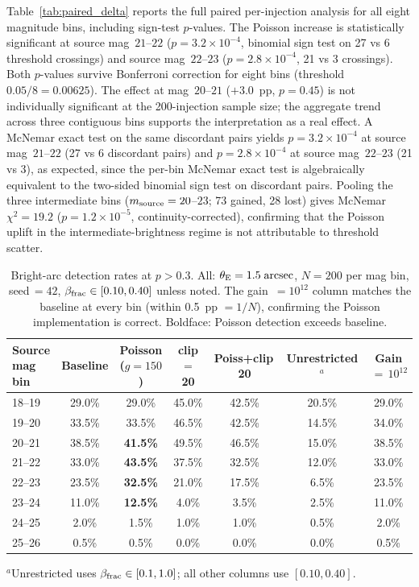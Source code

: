\documentclass[fleqn,usenatbib]{rasti}
\begin{document}
Table~\ref{tab:paired_delta} reports the full paired per-injection analysis for all eight magnitude bins, including sign-test $p$-values.  The Poisson increase is statistically significant at source mag~$21$--$22$ ($p = 3.2 \times 10^{-4}$, binomial sign test on 27 vs 6 threshold crossings) and source mag~$22$--$23$ ($p = 2.8 \times 10^{-4}$, 21 vs 3 crossings).  Both $p$-values survive Bonferroni correction for eight bins (threshold $0.05/8 = 0.00625$).  The effect at mag~$20$--$21$ ($+3.0$~pp, $p = 0.45$) is not individually significant at the 200-injection sample size; the aggregate trend across three contiguous bins supports the interpretation as a real effect.  A McNemar exact test on the same discordant pairs yields $p = 3.2 \times 10^{-4}$ at source mag~$21$--$22$ (27 vs 6 discordant pairs) and $p = 2.8 \times 10^{-4}$ at source mag~$22$--$23$ (21 vs 3), as expected, since the per-bin McNemar exact test is algebraically equivalent to the two-sided binomial sign test on discordant pairs.  Pooling the three intermediate bins ($m_{\rm source} = 20$--$23$; 73 gained, 28 lost) gives McNemar $\chi^{2} = 19.2$ ($p = 1.2 \times 10^{-5}$, continuity-corrected), confirming that the Poisson uplift in the intermediate-brightness regime is not attributable to threshold scatter.

\begin{table}
\caption{Bright-arc detection rates at $p>0.3$.  All: $\theta_{\rm E}=1.5\;\mathrm{arcsec}$, $N=200$ per mag bin, seed$\,=42$, $\beta_{\rm frac}\in[0.10,0.40]$ unless noted.  The gain~$= 10^{12}$ column matches the baseline at every bin (within 0.5~pp $= 1/N$), confirming the Poisson implementation is correct.  Boldface: Poisson detection exceeds baseline.}
\label{tab:brightarc}
\centering
\begin{tabular}{lcccccc}
\toprule
Source mag bin & Baseline & Poisson ($g\!=\!150$) & clip$\,=\,$20 & Poiss+clip\,20 & Unrestricted$^{a}$ & Gain$\,=\,10^{12}$ \\
\midrule
18--19 & 29.0\% & 29.0\% & 45.0\% & 42.5\% & 20.5\% & 29.0\% \\
19--20 & 33.5\% & 33.5\% & 46.5\% & 42.5\% & 14.5\% & 34.0\% \\
20--21 & 38.5\% & \textbf{41.5\%} & 49.5\% & 46.5\% & 15.0\% & 38.5\% \\
21--22 & 33.0\% & \textbf{43.5\%} & 37.5\% & 32.5\% & 12.0\% & 33.0\% \\
22--23 & 23.5\% & \textbf{32.5\%} & 21.0\% & 17.5\% &  6.5\% & 23.5\% \\
23--24 & 11.0\% & \textbf{12.5\%} &  4.0\% &  3.5\% &  2.5\% & 11.0\% \\
24--25 &  2.0\% &  1.5\% &  1.0\% &  1.0\% &  0.5\% &  2.0\% \\
25--26 &  0.5\% &  0.5\% &  0.0\% &  0.0\% &  0.0\% &  0.5\% \\
\bottomrule
\end{tabular}

\medskip
$^{a}$Unrestricted uses $\beta_{\rm frac} \in [0.1, 1.0]$; all other columns use $[0.10, 0.40]$.
\end{table}
\end{document}
